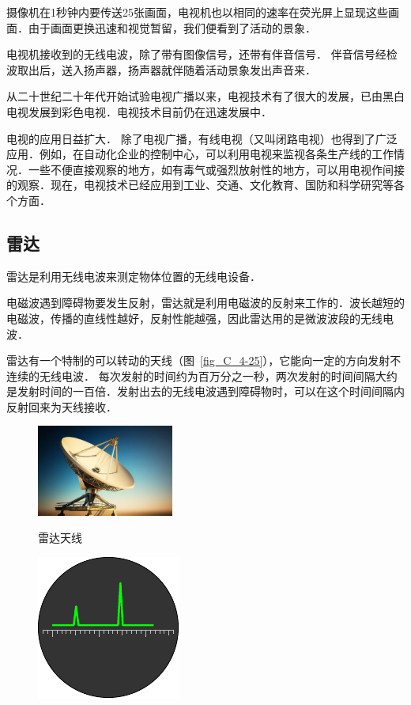 摄像机在1秒钟内要传送25张画面，电视机也以相同的速率在荧光屏上显现这些画面．由于画面更换迅速和视觉暂留，我们便看到了活动的景象．

电视机接收到的无线电波，除了带有图像信号，还带有伴音信号．
伴音信号经检波取出后，送入扬声器，扬声器就伴随着活动景象发出声音来．

从二十世纪二十年代开始试验电视广播以来，电视技术有了很大的发展，已由黑白电视发展到彩色电视．电视技术目前仍在迅速发展中．

电视的应用日益扩大．
除了电视广播，有线电视（又叫闭路电视）也得到了广泛应用．例如，在自动化企业的控制中心，可以利用电视来监视各条生产线的工作情况．一些不便直接观察的地方，如有毒气或强烈放射性的地方，可以用电视作间接的观察．现在，电视技术已经应用到工业、交通、文化教育、国防和科学研究等各个方面．

\subsection{雷达}

雷达是利用无线电波来测定物体位置的无线电设备．

电磁波遇到障碍物要发生反射，雷达就是利用电磁波的反射来工作的．波长越短的电磁波，传播的直线性越好，反射性能越强，因此雷达用的是微波波段的无线电波．

雷达有一个特制的可以转动的天线（图~\ref{fig_C_4-25}），它能向一定的方向发射不连续的无线电波．
每次发射的时间约为百万分之一秒，两次发射的时间间隔大约是发射时间的一百倍．发射出去的无线电波遇到障碍物时，可以在这个时间间隔内反射回来为天线接收．
\begin{figure}[htbp]
    \centering
    \begin{minipage}[b]{0.4\linewidth}
    	\centering
    	\includegraphics[height=3cm]{fig/C/4-25.png}
    	\caption{雷达天线}\label{fig_C_4-25}
    \end{minipage}
    \hfil
     \begin{minipage}[b]{0.4\linewidth}
    	\centering
    	\includegraphics{fig/C/4-26.pdf}
    	\caption{}\label{fig_C_4-26}
    \end{minipage}
\end{figure}

